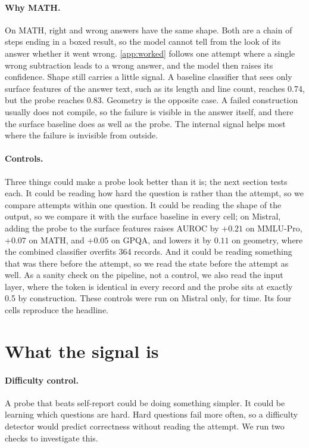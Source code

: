\documentclass{article}
\begin{document}
\paragraph{Why MATH.}
On MATH, right and wrong answers have the same shape.
Both are a chain of steps ending in a boxed result, so the model cannot tell from the look of its answer whether it went wrong.
\cref{app:worked} follows one attempt where a single wrong subtraction leads to a wrong answer, and the model then raises its confidence.
Shape still carries a little signal.
A baseline classifier that sees only surface features of the answer text, such as its length and line count, reaches 0.74, but the probe reaches 0.83.
Geometry is the opposite case.
A failed construction usually does not compile, so the failure is visible in the answer itself, and there the surface baseline does as well as the probe.
The internal signal helps most where the failure is invisible from outside.

\paragraph{Controls.}
Three things could make a probe look better than it is; the next section tests each.
It could be reading how hard the question is rather than the attempt, so we compare attempts within one question.
It could be reading the shape of the output, so we compare it with the surface baseline in every cell; on Mistral, adding the probe to the surface features raises AUROC by $+0.21$ on MMLU-Pro, $+0.07$ on MATH, and $+0.05$ on GPQA, and lowers it by $0.11$ on geometry, where the combined classifier overfits 364 records.
And it could be reading something that was there before the attempt, so we read the state before the attempt as well.
As a sanity check on the pipeline, not a control, we also read the input layer, where the token is identical in every record and the probe sits at exactly 0.5 by construction.
These controls were run on Mistral only, for time.
Its four cells reproduce the headline.

\section{What the signal is}
\label{sec:what}

\paragraph{Difficulty control.}
A probe that beats self-report could be doing something simpler.
It could be learning which questions are hard.
Hard questions fail more often, so a difficulty detector would predict correctness without reading the attempt.
We run two checks to investigate this.
\end{document}
